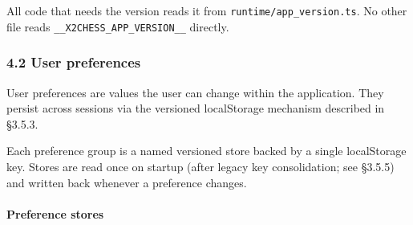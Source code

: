 \documentclass[]{article}
\let\oldparagraph\paragraph
\renewcommand{\paragraph}[1]{\oldparagraph{#1}\mbox{}}
\begin{document}
All code that needs the version reads it from
\texttt{runtime/app\_version.ts}. No other file reads
\texttt{\_\_X2CHESS\_APP\_VERSION\_\_} directly.

\subsubsection{4.2 User preferences}\label{user-preferences}

User preferences are values the user can change within the application.
They persist across sessions via the versioned localStorage mechanism
described in §3.5.3.

Each preference group is a named versioned store backed by a single
localStorage key. Stores are read once on startup (after legacy key
consolidation; see §3.5.5) and written back whenever a preference
changes.

\paragraph{Preference stores}\label{preference-stores}
\end{document}
